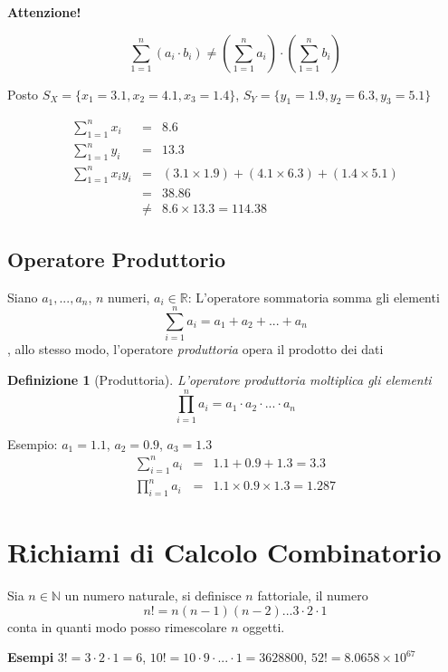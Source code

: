 \documentclass[
  11pt,
]{book}
\theoremstyle{mytheoremstyle}
\theoremstyle{mydefstyle}
\newtheorem{definition}{Definizione}[section]
\begin{document}
\textbf{Attenzione!}

\[
\sum_{1=1}^n (a_i \cdot b_i) \ne \left(\sum_{1=1}^n  a_i \right)\cdot\left(\sum_{1=1}^n  b_i\right)
\]

Posto \(S_X=\{x_1 = 3.1,x_2 = 4.1, x_3 = 1.4\}\),
\(S_Y=\{y_1 = 1.9,y_2 = 6.3, y_3 = 5.1\}\)

\begin{eqnarray*}
\sum_{1=1}^n x_i    &=&  8.6\\
\sum_{1=1}^n y_i    &=&  13.3\\
\sum_{1=1}^n x_i y_i   &=&  ( 3.1 \times 1.9 )+( 4.1 \times 6.3 )+( 1.4 \times 5.1 )\\
 &=& 38.86\\
 &\ne& 8.6\times 13.3=114.38
\end{eqnarray*}

\section{Operatore Produttorio}\label{operatore-produttorio}

Siano \(a_1,...,a_n\), \(n\) numeri, \(a_i\in\mathbb{R}\):
L'operatore sommatoria somma gli elementi
\[\sum_{i=1}^n a_i=a_1+ a_2+ ...+ a_n\],
allo stesso modo, l'operatore \emph{produttoria} opera il prodotto dei dati

\begin{definition}[Produttoria]
L'operatore produttoria moltiplica gli elementi
\[\prod_{i=1}^n a_i=a_1\cdot a_2\cdot ...\cdot a_n\]
\end{definition}

Esempio: \(a_1=1.1\), \(a_2=0.9\), \(a_3=1.3\)
\begin{eqnarray*}
 \sum_{i=1}^n a_i &=& 1.1 + 0.9 + 1.3 = 3.3\\
 \prod_{i=1}^n a_i &=& 1.1 \times 0.9 \times 1.3 = 1.287
\end{eqnarray*}

\chapter{Richiami di Calcolo Combinatorio}\label{richiami-di-calcolo-combinatorio}

Sia \(n\in\mathbb{N}\) un numero naturale, si definisce \(n\) fattoriale, il numero
\[n!=n(n-1)(n-2)...3\cdot 2 \cdot 1\]
conta in quanti modo posso rimescolare \(n\) oggetti.

\textbf{Esempi} \(3!=3\cdot 2\cdot 1=6\), \(10!=10\cdot 9\cdot... \cdot1 =3628800\), \(52!=\ensuremath{8.0658\times 10^{67}}\)
\end{document}
